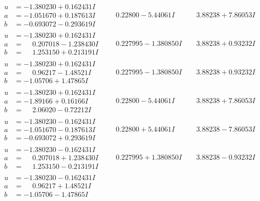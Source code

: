 \documentclass[1p]{elsarticle_modified}
\theoremstyle{definition}
\begin{document}
$$\begin{array}{c|c|c}
\begin{aligned}
u &= -1.380230 + 0.162431 I \\
a &= -1.051670 + 0.187613 I \\
b &= -0.693072 - 0.293619 I\end{aligned}
 & \phantom{-}0.22800 - 5.44061 I & \phantom{-}3.88238 + 7.86053 I \\ \hline\begin{aligned}
u &= -1.380230 + 0.162431 I \\
a &= \phantom{-}0.207018 - 1.238430 I \\
b &= \phantom{-}1.253150 + 0.213191 I\end{aligned}
 & \phantom{-}0.227995 - 1.380850 I & \phantom{-}3.88238 + 0.93232 I \\ \hline\begin{aligned}
u &= -1.380230 + 0.162431 I \\
a &= \phantom{-}0.96217 - 1.48521 I \\
b &= -1.05706 + 1.47865 I\end{aligned}
 & \phantom{-}0.227995 - 1.380850 I & \phantom{-}3.88238 + 0.93232 I \\ \hline\begin{aligned}
u &= -1.380230 + 0.162431 I \\
a &= -1.89166 + 0.16166 I \\
b &= \phantom{-}2.06020 - 0.72212 I\end{aligned}
 & \phantom{-}0.22800 - 5.44061 I & \phantom{-}3.88238 + 7.86053 I \\ \hline\begin{aligned}
u &= -1.380230 - 0.162431 I \\
a &= -1.051670 - 0.187613 I \\
b &= -0.693072 + 0.293619 I\end{aligned}
 & \phantom{-}0.22800 + 5.44061 I & \phantom{-}3.88238 - 7.86053 I \\ \hline\begin{aligned}
u &= -1.380230 - 0.162431 I \\
a &= \phantom{-}0.207018 + 1.238430 I \\
b &= \phantom{-}1.253150 - 0.213191 I\end{aligned}
 & \phantom{-}0.227995 + 1.380850 I & \phantom{-}3.88238 - 0.93232 I \\ \hline\begin{aligned}
u &= -1.380230 - 0.162431 I \\
a &= \phantom{-}0.96217 + 1.48521 I \\
b &= -1.05706 - 1.47865 I\end{aligned}

\end{array}$$
\end{document}
